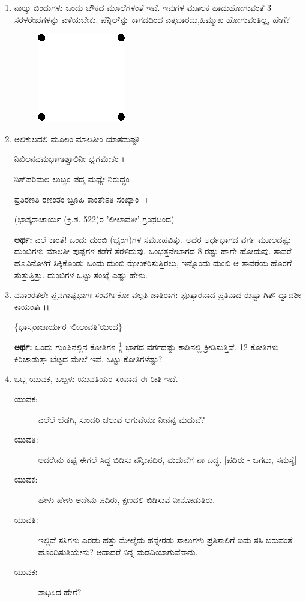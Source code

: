 \begin{enumerate}
\item ನಾಲ್ಕು ಬಿಂದುಗಳು ಒಂದು ಚೌಕದ ಮೂಲೆಗಳಂತೆ ಇವೆ. ಇವುಗಳ ಮೂಲಕ ಹಾದು\-ಹೋಗುವಂತೆ 3 ಸರಳರೇಖೆಗಳನ್ನು ಎಳೆಯಬೇಕು. ಪೆನ್ಸಿಲ್‌ನ್ನು  ಕಾಗದದಿಂದ ಎತ್ತಬಾರದು,\break ಹಿಮ್ಮುಖ ಹೋಗುವಂತಿಲ್ಲ, ಹೇಗೆ? 
\begin{figure}[!h]
\centering
\includegraphics{images/chap1/fig5.eps}
\end{figure}

\item ಅಲಿಕುಲದಲಿ ಮೂಲಂ ಮಾಲತೀಂ ಯಾತಮಷ್ಟೌ 

ನಿಖಿಲನವಮಭಾಗಾಶ್ಚಾಲಿನೀ ಭೃಗಮೇಕಂ ।

ನಿಶ್‌ಪರಿಮಲ ಲುಬ್ಧಂ ಪದ್ಮ ಮಧ್ಯೇ ನಿರುದ್ಧಂ

ಪ್ರತಿರಣತಿ ರಣಂತಂ ಬ್ರೂಹಿ ಕಾಂತೇಽತಿ ಸಂಖ್ಯಾಂ ।।

\hfill (ಭಾಸ್ಕರಾಚಾರ್ಯ (ಕ್ರಿ.ಶ. 522)ರ 'ಲೀಲಾವತೀ' ಗ್ರಂಥದಿಂದ)

\medskip

{\bf ಅರ್ಥ:} ಎಲೆ ಕಾಂತೆ! ಒಂದು ದುಂಬಿ (ಭೃಂಗ)ಗಳ ಸಮೂಹವಿತ್ತು. ಅದರ ಅರ್ಧ\-ಭಾಗದ ವರ್ಗ ಮೂಲದಷ್ಟು ದುಂಬಿಗಳು ಮಾಲತೀ ಪುಷ್ಪಗಳ ಕಡೆಗೆ ತೆರಳಿದುವು. ಒಂಭತ್ತನೇ\break ಭಾಗದ 8 ರಷ್ಟು ಹಾಗೇ ಹೋದುವು. ತಾವರೆ ಹೂವಿನೊಳಗೆ ಸಿಕ್ಕಿಕೊಂಡು ಒಂದು ದುಂಬಿ ಝೇಂಕರಿಸುತ್ತಿರಲು, ಇನ್ನೊಂದು ದುಂಬಿ ಆ ತಾವರೆಯ ಹೊರಗೆ ಸುತ್ತುತ್ತಿತ್ತು. ದುಂಬಿಗಳ ಒಟ್ಟು ಸಂಖ್ಯೆ ಎಷ್ಟು ಹೇಳು.

\item ವನಾಂರತಲೇ ಪ್ಲವಗಾಷ್ಟಭಾಗಃ ಸಂವರ್ಗಿಕೋ ವಲ್ಗತಿ ಜಾತಿರಾಗ: ಫೂತ್ಕಾರನಾದ ಪ್ರತಿನಾದ ರುಷ್ಟಾ ಗಿತೌ ದ್ವಾದಶೀ ಕಾಯಂತಃ ।।

\hfill \{ಭಾಸ್ಕರಾಚಾರ್ಯರ `ಲೀಲಾವತಿ'ಯಿಂದ\}

{\bf ಅರ್ಥ:} ಒಂದು ಗುಂಪಿನಲ್ಲಿನ ಕೋತಿಗಳ $\frac{1}{8}$ ಭಾಗದ ವರ್ಗದಷ್ಟು ಕಾಡಿನಲ್ಲಿ ಕ್ರೀಡಿಸುತ್ತಿವೆ. 12 ಕೋತಿಗಳು ಕಿರಿಚಾಡುತ್ತಾ ಬೆಟ್ಟದ ಮೇಲೆ ಇವೆ. ಒಟ್ಟು ಕೋತಿಗಳೆಷ್ಟು?

\item ಒಬ್ಬ ಯುವಕ, ಒಬ್ಬಳು ಯುವತಿಯರ ಸಂವಾದ ಈ ರೀತಿ ಇದೆ.
\begin{description}
\item[ಯುವಕ:] ಎಲೆಲೆ ಬೆಡಗಿ, ಸುಂದರಿ ಚಲುವೆ ಆಗುವೆಯಾ ನೀನೆನ್ನ ಮದುವೆ?
\item[ಯುವತಿ:] ಅದರೇನು ಕಷ್ಟ ಈಗಲೆ ಸಿದ್ಧ ಬಿಡಿಸು ನನ್ನೀಪದಿರ, ಮದುವೆಗೆ ನಾ ಬದ್ಧ.  [ಪದಿರು - ಒಗಟು, ಸಮಸ್ಯೆ]
\item[ಯುವಕ:] ಹೇಳು ಹೇಳು ಅದೇನು ಪದಿರು, ಕ್ಷಣದಲಿ ಬಿಡಿಸುವೆ ನೀನೋಡುತಿರು. 
\item[ಯುವತಿ:] ಇಲ್ಲಿವೆ ಸಸಿಗಳು ಎರಡು ಹತ್ತು ಮೇಲೈದು ಹನ್ನೇರಡು ಸಾಲುಗಳು ಪ್ರತಿಸಾಲಿಗೆ ಐದು ಸಸಿ ಬರುವಂತೆ ಹೊಂದಿಸುತಿಯೇನು? ಅದಾದರೆ ನಿನ್ನ ಮಡದಿಯಾಗುವೆನಾನು.
\item[ಯುವಕ:] ಸಾಧಿಸಿದ ಹೇಗೆ?
\end{description}


\end{enumerate}
